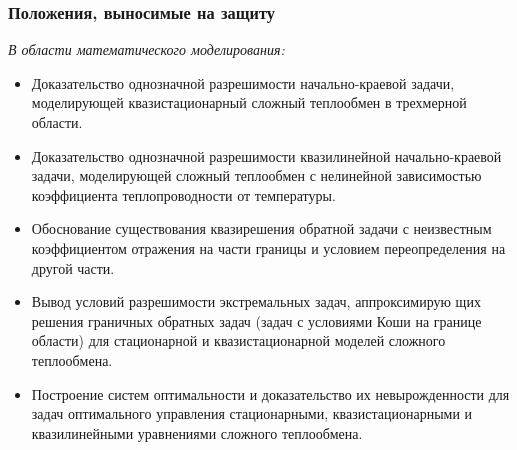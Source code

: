 \begin{frame}
    \setcounter{framenumber}{1}
    \maketitle
\end{frame}

\begin{frame}
    \frametitle{Положения, выносимые на защиту}
    \textit{В области математического моделирования:}
    \begin{itemize}
        \item Доказательство однозначной разрешимости начально-краевой задачи,
        моделирующей квазистационарный сложный теплообмен в трехмерной
        области.
        \item Доказательство однозначной разрешимости квазилинейной начально-краевой задачи,
        моделирующей сложный теплообмен с нелинейной
        зависимостью коэффициента теплопроводности от температуры.
        \item Обоснование существования квазирешения обратной задачи с неизвестным
        коэффициентом отражения на части границы и условием
        переопределения на другой части.
        \item Вывод условий разрешимости экстремальных задач, аппроксимирую
        щих решения граничных обратных задач (задач с условиями Коши на границе области)
        для стационарной и квазистационарной моделей сложного теплообмена.
        \item Построение систем оптимальности и доказательство их невырожденности для задач оптимального управления стационарными, квазистационарными
        и квазилинейными уравнениями сложного теплообмена.
    \end{itemize}
\end{frame}


